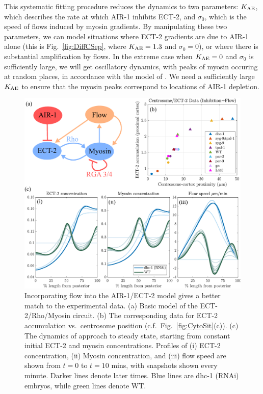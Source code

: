 \documentclass[11pt]{article}
\begin{document}
This systematic fitting procedure reduces the dynamics to two parameters: $K_\text{AE}$, which describes the rate at which AIR-1 inhibits ECT-2, and $\sigma_0$, which is the speed of flows induced by myosin gradients. By manipulating these two parameters, we can model situations where ECT-2 gradients are due to AIR-1 alone (this is Fig.\ \ref{fig:DiffCSep}, where $K_\text{AE}=1.3$ and $\sigma_0=0$), or where there is substantial amplification by flows. In the extreme case when $K_\text{AE}=0$ and $\sigma_0$ is sufficiently large, we will get oscillatory dynamics, with peaks of myosin occuring at random places, in accordance with the model of \cite{michaux2018excitable}. We need a sufficiently large $K_\text{AE}$ to ensure that the myosin peaks correspond to locations of AIR-1 depletion.

\begin{figure}
\centering
\includegraphics[width=\textwidth]{Glotzer/Fig4/Fig4-crop.pdf}
\caption{\label{fig:CytoWFlow}Incorporating flow into the AIR-1/ECT-2 model gives a better match to the experimental data. (a) Basic model of the ECT-2/Rho/Myosin circuit. (b) The corresponding data for ECT-2 accumulation vs.\ centrosome position (c.f.\ Fig.\ \ref{fig:CytoSit}(c)). (c) The dynamics of approach to steady state, starting from constant initial ECT-2 and myosin concentrations. Profiles of (i) ECT-2 concentration, (ii) Myosin concentration, and (iii) flow speed are shown from $t=0$ to $t=10$ mins, with snapshots shown every minute. Darker lines denote later times. Blue lines are dhc-1 (RNAi) embryos, while green lines denote WT. }
\end{figure}
\end{document}
